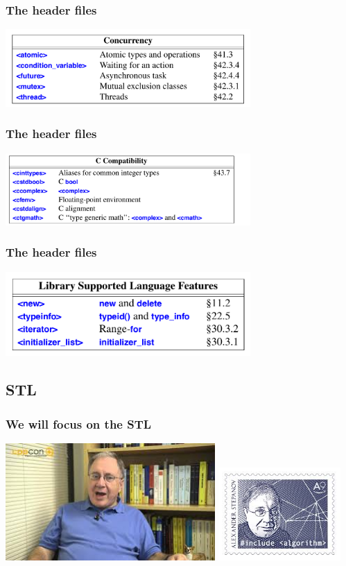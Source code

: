 \begin{frame}
  \frametitle{The header files}
  \centering
  \includegraphics[width=0.7\textwidth]{img/head_10.png}
\end{frame}
\begin{frame}
  \frametitle{The header files}
  \centering
  \includegraphics[width=0.7\textwidth]{img/head_11.png}
\end{frame}
\begin{frame}
  \frametitle{The header files}
  \centering
  \includegraphics[width=0.7\textwidth]{img/head_12.png}
\end{frame}
\subsection{STL}
\begin{frame}
  \frametitle{We will focus on the STL \smiley}
  \centering
  \includegraphics[width=0.6\textwidth]{img/alex.jpeg}
  \hfill
  \includegraphics[width=0.35\textwidth]{img/alex2.jpeg}
  \hfill
\end{frame}
